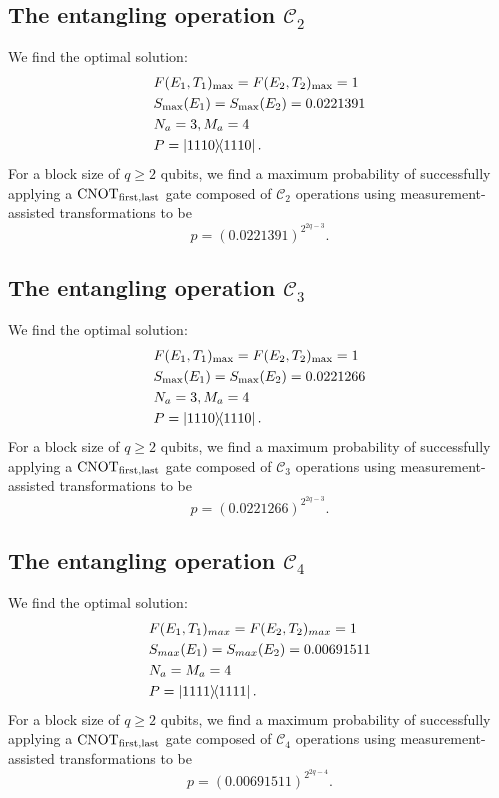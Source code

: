 \documentclass[aps,pra,twocolumn,superscriptaddress,floatfix,10pt]{revtex4}
\begin{document}
\subsection{The entangling operation $\mathcal{C}_2$}
We find the optimal solution:
\begin{eqnarray}
& F(E_1,T_1)_{\rm max} = F(E_2,T_2)_{\rm max} = 1 \nonumber \\
&S_{\rm max}(E_1) = S_{\rm max}(E_2) = 0.0221391 \\
&N_a = 3,M_a=4 \nonumber \\
&P = \outerproduct{1110}{1110} \nonumber	.
\end{eqnarray}
For a block size of $q \ge 2$ qubits, we find a maximum probability of successfully applying a $\mbox{CNOT}_{\rm first,last}$ gate composed of $\mathcal{C}_2$ operations  using measurement-assisted transformations to be
\begin{equation}
\label{2C2T Result}
p = (0.0221391)^{2^{2q-3}}.
\end{equation}
\subsection{The entangling operation $\mathcal{C}_3$}
We find the optimal solution:
\begin{eqnarray}
& F(E_1,T_1)_{\rm max} = F(E_2,T_2)_{\rm max} = 1 \nonumber \\
& S_{\rm max}(E_1) = S_{\rm max}(E_2) = 0.0221266 \\
& N_a = 3,M_a=4 \nonumber \\
& P = \outerproduct{1110}{1110} .\nonumber	
\end{eqnarray}
For a block size of $q \ge 2 $ qubits, we find a maximum probability of successfully applying a $\mbox{CNOT}_{\rm first,last}$ gate composed of $\mathcal{C}_3$ operations  using measurement-assisted transformations to be
\begin{equation}
\label{1C4T Result}
p = (0.0221266)^{2^{2q-3}}.
\end{equation}
\subsection{The entangling operation $\mathcal{C}_4$}
We find the optimal solution:
 \begin{eqnarray}
 & F(E_1,T_1)_{max} = F(E_2,T_2)_{max} = 1 \nonumber\\
 & S_{max}(E_1) = S_{max}(E_2) = 0.00691511 \\
 & N_a = M_a=4 \nonumber\\
 & P = \outerproduct{1111}{1111}. \nonumber	
 \end{eqnarray}
For a block size of $q \ge 2$ qubits, we find a maximum probability of successfully applying a $\mbox{CNOT}_{\rm first,last}$ gate composed of $\mathcal{C}_4$ operations  using measurement-assisted transformations to be
 \begin{equation}
 \label{2C4T Result}
 p = (0.00691511)^{2^{2q-4}}.
 \end{equation}
\end{document}

